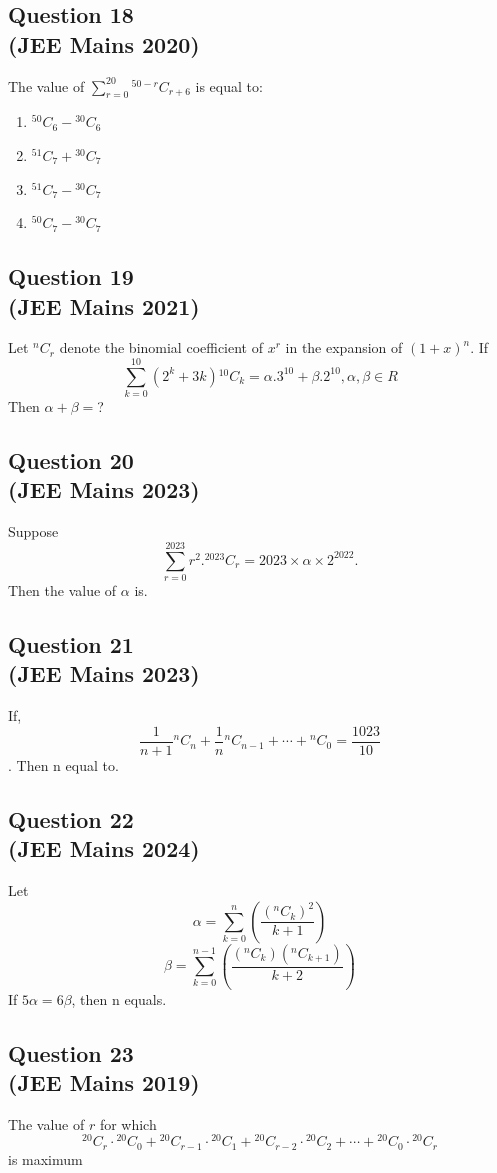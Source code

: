 \subsection*{Question 18 \\ \small(JEE Mains 2020)}
The value of $\sum_{r=0}^{20} {}^{50-r}C_{r+6}$ is equal to: 
\begin{enumerate}
    \item ${}^{50}C_{6} - {}^{30}C_{6}$
    \item ${}^{51}C_{7}+{}^{30}C_{7}$
    \item ${}^{51}C_{7} - {}^{30}C_{7}$
    \item ${}^{50}C_{7} - {}^{30}C_{7}$
\end{enumerate}

\subsection*{Question 19 \\ \small(JEE Mains 2021)}
Let ${}^{n}C_{r}$ denote the binomial coefficient of $x^r$ in the expansion of $(1+x)^n$. If \[
\sum_{k=0}^{10} (2^k+3k){}^{10}C_{k} = \alpha .3^{10}+\beta.2^{10}, \alpha, \beta \in R
\]
Then $\alpha+\beta=$?
\newpage

\subsection*{Question 20 \\ \small(JEE Mains 2023)}
Suppose \[
\sum_{r=0}^{2023}r^2.{}^{2023}C_{r} = 2023 \times\alpha\times2^{2022}.
\]
Then the value of $\alpha$ is.

\subsection*{Question 21 \\ \small(JEE Mains 2023)}
If, \[
\frac{1}{n+1}{}^{n}C_{n}+\frac{1}{n}{}^{n}C_{n-1}+\cdots+{}^{n}C_{0} = \frac{1023}{10}
\]. Then n equal to.

\subsection*{Question 22 \\ \small(JEE Mains 2024)}
Let \[
\alpha = \sum_{k=0}^{n} (\frac{({}^{n}C_{k})^2}{k+1})
\]
\[
\beta = \sum_{k=0}^{n-1}(\frac{({}^{n}C_{k})({}^{n}C_{k+1})}{k+2}) 
\]
If $5\alpha = 6\beta$, then n equals.

\subsection*{Question 23 \\ \small(JEE Mains 2019)}
The value of $r$ for which \[
{}^{20}C_{r}\cdot{}^{20}C_{0}+{}^{20}C_{r-1}\cdot{}^{20}C_{1}+{}^{20}C_{r-2}\cdot{}^{20}C_{2}+\cdots+{}^{20}C_{0}\cdot{}^{20}C_{r}
\] is maximum

